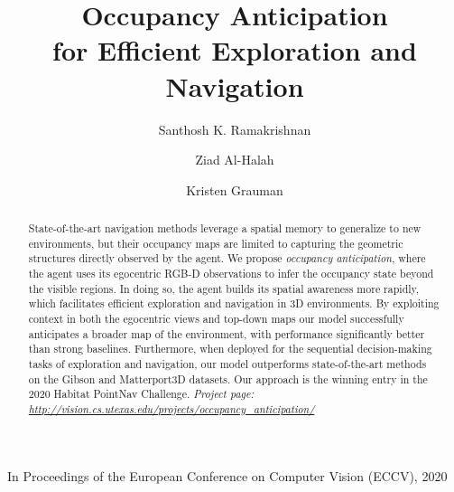 \documentclass[runningheads]{llncs}
\renewcommand{\footnotesize}{\scriptsize}
\begin{document}
\pagestyle{headings}
\mainmatter

\title{Occupancy Anticipation\\for Efficient Exploration and Navigation}

\author{Santhosh K. Ramakrishnan \and
Ziad Al-Halah \and
Kristen Grauman}




\vspace*{-2.0cm}
\begin{center}
    \footnotesize{In Proceedings of the European Conference on Computer Vision (ECCV), 2020}
\end{center}

\begingroup
\let\newpage\relax \maketitle
\endgroup



\begin{abstract}
State-of-the-art navigation methods leverage a spatial memory to generalize to new environments, but their occupancy maps are limited to capturing the geometric structures directly observed by the agent. We propose \emph{occupancy anticipation}, where the agent uses its egocentric RGB-D observations to infer the occupancy state beyond the visible regions. In doing so, the agent builds its spatial awareness more rapidly, which facilitates efficient exploration and navigation in 3D environments.   By exploiting context in both the egocentric views and top-down maps our model successfully anticipates a broader map of the environment, with performance significantly better than strong baselines. Furthermore, when deployed for the sequential decision-making tasks of exploration and navigation, our model outperforms state-of-the-art methods on the Gibson and Matterport3D datasets. Our approach is the winning entry in the 2020 Habitat PointNav Challenge. 
\emph{Project page: \url{http://vision.cs.utexas.edu/projects/occupancy_anticipation/}}
\end{abstract}
\end{document}
